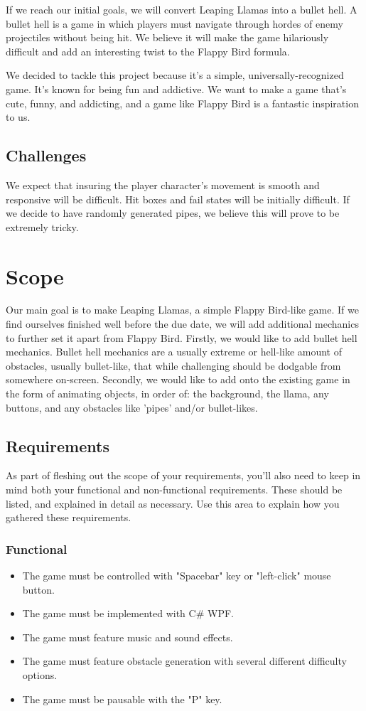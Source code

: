 \documentclass[10pt,conference,onecolumn,compsoc]{IEEEtran}
\begin{document}
	If we reach our initial goals, we will convert Leaping Llamas into a bullet hell. A bullet hell is a game in which players must navigate through hordes of enemy projectiles without being hit. We believe it will make the game hilariously difficult and add an interesting twist to the Flappy Bird formula.

	We decided to tackle this project because it's a simple, universally-recognized game. It's known for being fun and addictive. We want to make a game that's cute, funny, and addicting, and a game like Flappy Bird is a fantastic inspiration to us.

\subsection{Challenges}
	We expect that insuring the player character's movement is smooth and responsive will be difficult. Hit boxes and fail states will be initially difficult. If we decide to have randomly generated pipes, we believe this will prove to be extremely tricky.

\section{Scope}
	Our main goal is to make Leaping Llamas, a simple Flappy Bird-like game. If we find ourselves finished well before the due date, we will add additional mechanics to further set it apart from Flappy Bird. Firstly, we would like to add bullet hell mechanics. Bullet hell mechanics are a usually extreme or hell-like amount of obstacles, usually bullet-like, that while challenging should be dodgable from somewhere on-screen.  Secondly, we would like to add onto the existing game in the form of animating objects, in order of: the background, the llama, any buttons, and any obstacles like 'pipes' and/or bullet-likes. 

\subsection{Requirements}
	As part of fleshing out the scope of your requirements, you'll also need to keep in mind both your functional and non-functional requirements.  These should be listed, and explained in detail as necessary.  Use this area to explain how you gathered these requirements.

\subsubsection{Functional}
	\begin{itemize}
	\item The game must be controlled with "Spacebar" key or "left-click" mouse button.
	\item The game must be implemented with C\# WPF.
	\item The game must feature music and sound effects.
	\item The game must feature obstacle generation with several different difficulty options.
	\item The game must be pausable with the "P" key.
	\end{itemize}
\end{document}
